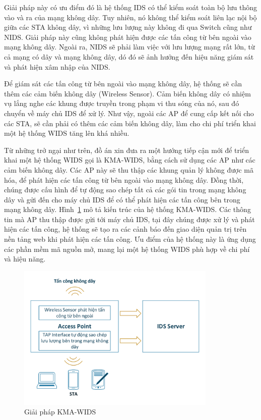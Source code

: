 Giải pháp này có ưu điểm đó là hệ thống IDS có thể kiểm soát toàn bộ lưu thông vào và ra của mạng không dây. Tuy nhiên, nó không thể kiểm soát liên lạc nội bộ giữa các STA không dây, vì những lưu lượng này không đi qua Switch cũng như NIDS. Giải pháp này cũng không phát hiện được các tấn công từ bên ngoài vào mạng không dây. Ngoài ra, NIDS sẽ phải làm việc với lưu lượng mạng rất lớn, từ cả mạng có dây và mạng không dây, dó đó sẽ ảnh hưởng đến hiệu năng giám sát và phát hiện xâm nhập của NIDS.

Để giám sát các tấn công từ bên ngoài vào mạng không dây, hệ thống sẽ cần thêm các cảm biến không dây (Wireless Sensor). Cảm biến không dây có nhiệm vụ lắng nghe các khung được truyền trong phạm vi thu sóng của nó, sau đó chuyển về máy chủ IDS để xử lý. Như vậy, ngoài các AP để cung cấp kết nối cho các STA, sẽ cần phải có thêm các cảm biến không dây, làm cho chi phí triển khai một hệ thống WIDS tăng lên khá nhiều.

Từ những trở ngại như trên, đồ án xin đưa ra một hướng tiếp cận mới để triển khai một hệ thống WIDS gọi là KMA-WIDS, bằng cách sử dụng các AP như các cảm biến không dây. Các AP này sẽ thu thập các khung quản lý không được mã hóa, để phát hiện các tấn công từ bên ngoài vào mạng không dây. Đồng thời, chúng được cấu hình để tự động sao chép tất cả các gói tin trong mạng không dây và gửi đến cho máy chủ IDS để có thể phát hiện các tấn công bên trong mạng không dây. Hình~\ref{fig:diagram-wids-new} mô tả kiến trúc của hệ thống KMA-WIDS. Các thông tin mà AP thu thập được gửi tới máy chủ IDS, tại đây chúng được xử lý và phát hiện các tấn công, hệ thống sẽ tạo ra các cảnh báo đến giao diện quản trị trên nền tảng web khi phát hiện các tấn công. Ưu điểm của hệ thống này là ứng dụng các phần mềm mã nguồn mở, mang lại một hệ thống WIDS phù hợp về chi phí và hiệu năng.

\begin{figure}[H]
    \centering
    \includegraphics[width=0.85\textwidth]{diagram-wids-new}
    \caption{
        \label{fig:diagram-wids-new}
        Giải pháp KMA-WIDS}
\end{figure}

